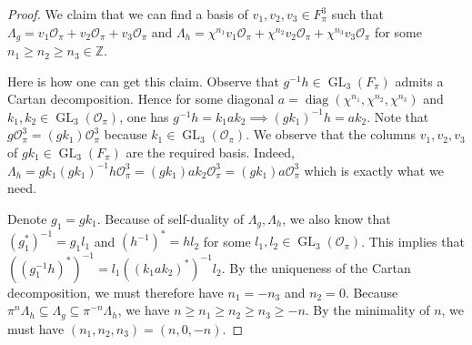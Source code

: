\documentclass{eptcs}
\theoremstyle{remark}
\theoremstyle{definition}
\DeclareMathOperator{\GL}{GL}
\DeclareMathOperator{\diag}{diag}
\begin{document}
\begin{proof}
We claim that we can find a basis of $v_{1},v_{2},v_{3} \in F_{\pi}^{3}$ such that $\Lambda_{g} = v_{1} \mathcal{O}_{\pi} + v_{2} \mathcal{O}_{\pi} + v_{3} \mathcal{O}_{\pi}$ and $\Lambda_{h} = \chi^{n_{1}} v_{1} \mathcal{O}_{\pi} +  \chi^{n_{2}}v_{2} \mathcal{O}_{\pi} + \chi^{n_{3}} v_{3} \mathcal{O}_{\pi}$ for some $n_{1} \geq n_{2} \geq n_{3} \in \mathbb{Z}$. 

    Here is how one can get this claim. 
    Observe that $g^{-1} h \in \GL_{3}(F_{\pi})$ admits a Cartan decomposition.
    Hence for some diagonal $a= \diag( \chi ^{n_{1}}, \chi^{n_{2}}, \chi^{n_{3}})$ and $k_{1},k_{2} \in \GL_{3}(\mathcal{O}_{\pi})$, one has $g^{-1} h = k_{1} a k_{2} \implies  (g k_{1})^{-1} h = a k_{2}$. 
    Note that $g \mathcal{O}_{\pi}^{3} = (gk_{1}) \mathcal{O}_{\pi}^{3}$ because $k_{1} \in \GL_{3}(\mathcal{O}_{\pi})$.
    We observe that the columns $v_{1},v_{2},v_{3}$ of $gk_{1} \in \GL_{3}(F_{\pi})$ are the required basis. Indeed, $\Lambda_{h} = gk_{1}(gk_{1})^{-1} h \mathcal{O}_{\pi}^{3} = (gk_{1}) a k_{2} \mathcal{O}_{\pi}^{3} = (gk_{1}) a \mathcal{O}_{\pi}^{3}$ which is exactly what we need.


    Denote $g_{1} = g k_{1}$.
    Because of self-duality of $\Lambda_{g},\Lambda_{h}$, 
    we also know that $(g_{1}^{*})^{-1} = g_{1} l_1$ and $(h^{-1})^{*} = h l_2$ for some $l_1,l_2 \in \GL_{3}(\mathcal{O}_{\pi})$. 
    This implies that $((g_{1}^{-1} h)^{*})^{-1} = l_{1} ((k_{1} a k_{2})^{*})^{-1} l_{2}$. By the uniqueness of the Cartan decomposition, we must therefore have $n_{1}=-n_{3}$ and $n_{2}=0$. 
    Because $ \pi^{n} \Lambda_{h} \subseteq \Lambda_{g} \subseteq \pi^{-n} \Lambda_{h}$, we have $ n \geq n_{1} \geq n_{2} \geq n_{3} \geq -n$. By the minimality of $n$, we must have $(n_{1},n_{2},n_{3})=(n,0,-n)$.


\end{proof}
\end{document}
